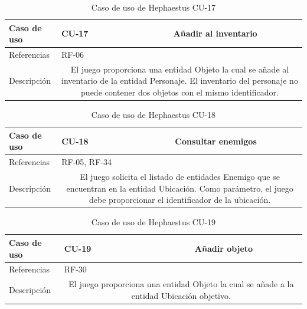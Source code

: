 \begin{table}[H]
	\centering
	\small
	\begin{tabularx}{\linewidth}{|l|cc|}
		\hline
		{\cellcolor[HTML]{C0C0C0} Caso de uso} & \multicolumn{1}{l|}{CU-17} & Añadir al inventario \\ \hline
		{\cellcolor[HTML]{C0C0C0} Referencias} & \multicolumn{2}{l|}{RF-06} \\ \hline
		{\cellcolor[HTML]{C0C0C0} Descripción} & \multicolumn{2}{X|}{El juego proporciona una entidad Objeto la cual se añade al inventario de la entidad Personaje. El inventario del personaje no puede contener dos objetos con el mismo identificador.} \\ \hline
	\end{tabularx}
	
	\vspace{0.5cm}
	\caption{Caso de uso de Hephaestus CU-17}
	\label{tab:hephaestus-cu-17}
\end{table}

\begin{table}[H]
	\centering
	\small
	\begin{tabularx}{\linewidth}{|l|cc|}
		\hline
		{\cellcolor[HTML]{C0C0C0} Caso de uso} & \multicolumn{1}{l|}{CU-18} & Consultar enemigos \\ \hline
		{\cellcolor[HTML]{C0C0C0} Referencias} & \multicolumn{2}{l|}{RF-05, RF-34} \\ \hline
		{\cellcolor[HTML]{C0C0C0} Descripción} & \multicolumn{2}{X|}{El juego solicita el listado de entidades Enemigo que se encuentran en la entidad Ubicación. Como parámetro, el juego debe proporcionar el identificador de la ubicación.} \\ \hline
	\end{tabularx}
	
	\vspace{0.5cm}
	\caption{Caso de uso de Hephaestus CU-18}
	\label{tab:hephaestus-cu-18}
\end{table}

\begin{table}[H]
	\centering
	\small
	\begin{tabularx}{\linewidth}{|l|cc|}
		\hline
		{\cellcolor[HTML]{C0C0C0} Caso de uso} & \multicolumn{1}{l|}{CU-19} & Añadir objeto \\ \hline
		{\cellcolor[HTML]{C0C0C0} Referencias} & \multicolumn{2}{l|}{RF-30} \\ \hline
		{\cellcolor[HTML]{C0C0C0} Descripción} & \multicolumn{2}{X|}{El juego proporciona una entidad Objeto la cual se añade a la entidad Ubicación objetivo.} \\ \hline
	\end{tabularx}
	
	\vspace{0.5cm}
	\caption{Caso de uso de Hephaestus CU-19}
	\label{tab:hephaestus-cu-19}
\end{table}

